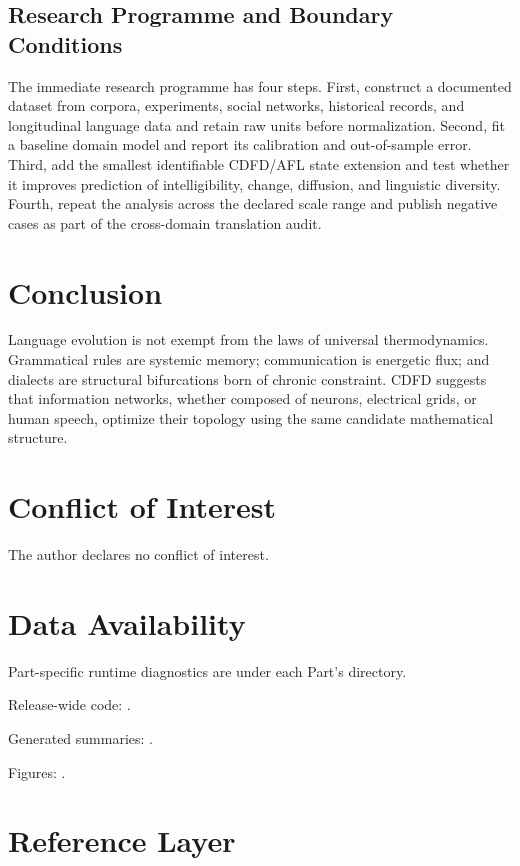 \documentclass[11pt,a4paper]{article}
\begin{document}
\subsection{Research Programme and Boundary Conditions}

The immediate research programme has four steps. First, construct a documented
dataset from corpora, experiments, social networks, historical records, and longitudinal language data and retain raw units before normalization.
Second, fit a baseline domain model and report its calibration and out-of-sample
error. Third, add the smallest identifiable CDFD/AFL state extension and test
whether it improves prediction of intelligibility, change, diffusion, and linguistic diversity. Fourth, repeat the
analysis across the declared scale range and publish negative cases as part of
the cross-domain translation audit.


\section{Conclusion}
Language evolution is not exempt from the laws of universal thermodynamics. Grammatical rules are systemic memory; communication is energetic flux; and dialects are structural bifurcations born of chronic constraint. CDFD suggests that information networks, whether composed of neurons, electrical grids, or human speech, optimize their topology using the same candidate mathematical structure.
\section*{Conflict of Interest} The author declares no conflict of interest.
\section*{Data Availability}
Part-specific runtime diagnostics are under each Part's  directory.

Release-wide code: .

Generated summaries: .

Figures: .


\section{Reference Layer}


\end{document}
